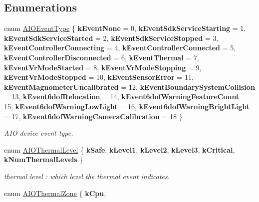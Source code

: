 \subsection*{Enumerations}
\begin{DoxyCompactItemize}
\item 
enum \mbox{\hyperlink{namespace_ximmerse_1_1_rhino_x_ab081ae2f0ca6ea05a0a1ab6143ba91a1}{A\+I\+O\+Event\+Type}} \{ \newline
{\bfseries k\+Event\+None} = 0, 
{\bfseries k\+Event\+Sdk\+Service\+Starting} = 1, 
{\bfseries k\+Event\+Sdk\+Service\+Started} = 2, 
{\bfseries k\+Event\+Sdk\+Service\+Stopped} = 3, 
\newline
{\bfseries k\+Event\+Controller\+Connecting} = 4, 
{\bfseries k\+Event\+Controller\+Connected} = 5, 
{\bfseries k\+Event\+Controller\+Disconnected} = 6, 
{\bfseries k\+Event\+Thermal} = 7, 
\newline
{\bfseries k\+Event\+Vr\+Mode\+Started} = 8, 
{\bfseries k\+Event\+Vr\+Mode\+Stopping} = 9, 
{\bfseries k\+Event\+Vr\+Mode\+Stopped} = 10, 
{\bfseries k\+Event\+Sensor\+Error} = 11, 
\newline
{\bfseries k\+Event\+Magnometer\+Uncalibrated} = 12, 
{\bfseries k\+Event\+Boundary\+System\+Collision} = 13, 
{\bfseries k\+Event6dof\+Relocation} = 14, 
{\bfseries k\+Event6dof\+Warning\+Feature\+Count} = 15, 
\newline
{\bfseries k\+Event6dof\+Warning\+Low\+Light} = 16, 
{\bfseries k\+Event6dof\+Warning\+Bright\+Light} = 17, 
{\bfseries k\+Event6dof\+Warning\+Camera\+Calibration} = 18
 \}
\begin{DoxyCompactList}\small\item\em A\+IO device event type. \end{DoxyCompactList}\item 
enum \mbox{\hyperlink{namespace_ximmerse_1_1_rhino_x_a5dc681e0c88cfeddf5c073421b71b0a4}{A\+I\+O\+Thermal\+Level}} \{ \newline
{\bfseries k\+Safe}, 
{\bfseries k\+Level1}, 
{\bfseries k\+Level2}, 
{\bfseries k\+Level3}, 
\newline
{\bfseries k\+Critical}, 
{\bfseries k\+Num\+Thermal\+Levels}
 \}
\begin{DoxyCompactList}\small\item\em thermal level \+: which level the thermal event indicates. \end{DoxyCompactList}\item 
enum \mbox{\hyperlink{namespace_ximmerse_1_1_rhino_x_a16299986ba040f9589ccf565ce232d75}{A\+I\+O\+Thermal\+Zone}} \{ {\bfseries k\+Cpu}, 

\end{DoxyCompactItemize}
